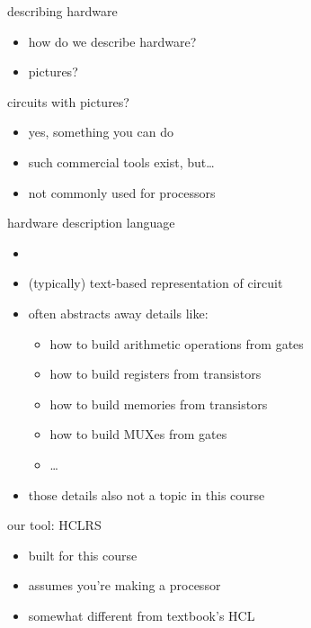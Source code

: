 
\begin{frame}{describing hardware}
    \begin{itemize}
    \item how do we describe hardware?
    \item pictures?
    \end{itemize}
\end{frame}

\begin{frame}{circuits with pictures?}
    \begin{itemize}
    \item yes, something you can do
    \item such commercial tools exist, but\ldots
    \vspace{.5cm}
    \item not commonly used for processors
    \end{itemize}
\end{frame}

\begin{frame}{hardware description language}
    \begin{itemize}
    \item {}
    \item (typically) text-based representation of circuit
    \vspace{.5cm}
    \item often abstracts away details like:
        \begin{itemize}
        \item how to build arithmetic operations from gates
        \item how to build registers from transistors
        \item how to build memories from transistors
        \item how to build MUXes from gates
        \item \ldots
        \end{itemize}
    \item those details also not a topic in this course
    \end{itemize}
\end{frame}

\begin{frame}{our tool: HCLRS}
    \begin{itemize}
    \item built for this course
    \item assumes you're making a processor
    \vspace{.5cm}
    \item somewhat different from textbook's HCL
    \end{itemize}
\end{frame}

